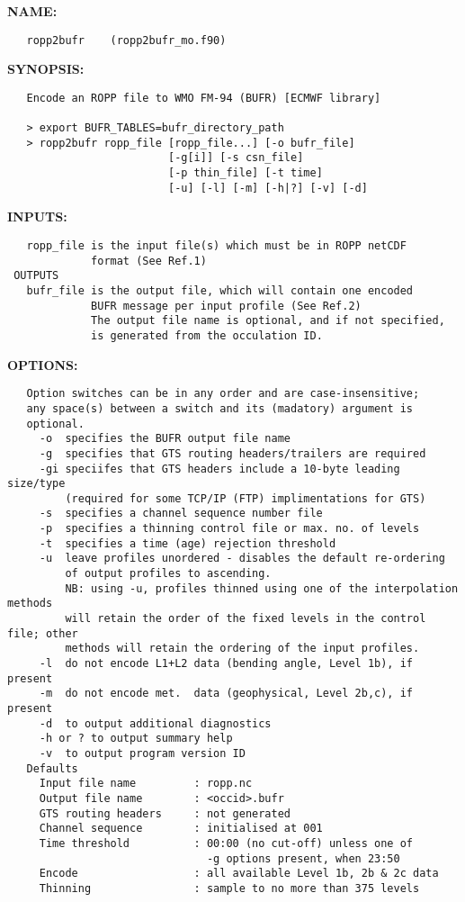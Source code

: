 \label{ch:robo86}
\label{ch:Programs_ropp2bufr_ec}
\textbf{NAME:}\hspace{0.08in}\begin{Verbatim}
   ropp2bufr    (ropp2bufr_mo.f90)
\end{Verbatim}
\textbf{SYNOPSIS:}\hspace{0.08in}\begin{Verbatim}
   Encode an ROPP file to WMO FM-94 (BUFR) [ECMWF library]

   > export BUFR_TABLES=bufr_directory_path
   > ropp2bufr ropp_file [ropp_file...] [-o bufr_file]
                         [-g[i]] [-s csn_file]
                         [-p thin_file] [-t time]
                         [-u] [-l] [-m] [-h|?] [-v] [-d]
\end{Verbatim}
\textbf{INPUTS:}\hspace{0.08in}\begin{Verbatim}
   ropp_file is the input file(s) which must be in ROPP netCDF
             format (See Ref.1)
 OUTPUTS
   bufr_file is the output file, which will contain one encoded
             BUFR message per input profile (See Ref.2)
             The output file name is optional, and if not specified,
             is generated from the occulation ID.
\end{Verbatim}
\textbf{OPTIONS:}\hspace{0.08in}\begin{Verbatim}
   Option switches can be in any order and are case-insensitive;
   any space(s) between a switch and its (madatory) argument is
   optional.
     -o  specifies the BUFR output file name
     -g  specifies that GTS routing headers/trailers are required
     -gi speciifes that GTS headers include a 10-byte leading size/type
         (required for some TCP/IP (FTP) implimentations for GTS)
     -s  specifies a channel sequence number file
     -p  specifies a thinning control file or max. no. of levels
     -t  specifies a time (age) rejection threshold
     -u  leave profiles unordered - disables the default re-ordering
         of output profiles to ascending.
         NB: using -u, profiles thinned using one of the interpolation methods
         will retain the order of the fixed levels in the control file; other
         methods will retain the ordering of the input profiles.
     -l  do not encode L1+L2 data (bending angle, Level 1b), if present
     -m  do not encode met.  data (geophysical, Level 2b,c), if present
     -d  to output additional diagnostics
     -h or ? to output summary help
     -v  to output program version ID
   Defaults
     Input file name         : ropp.nc
     Output file name        : <occid>.bufr
     GTS routing headers     : not generated
     Channel sequence        : initialised at 001
     Time threshold          : 00:00 (no cut-off) unless one of
                               -g options present, when 23:50
     Encode                  : all available Level 1b, 2b & 2c data
     Thinning                : sample to no more than 375 levels
\end{Verbatim}
